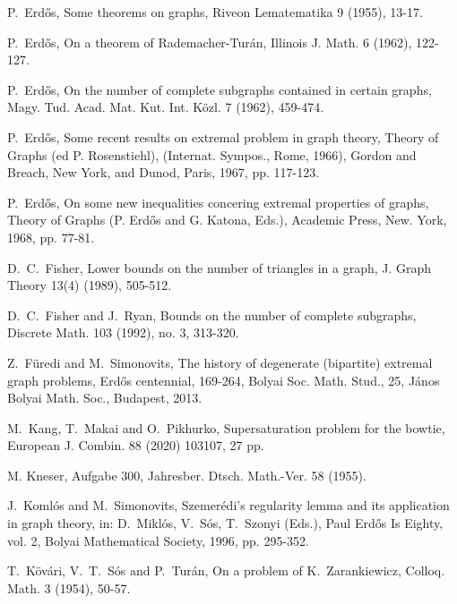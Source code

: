 \documentclass[10pt]{article}
\begin{document}
\begin{thebibliography}{1}




 P.~Erd\H{o}s, Some theorems on graphs, Riveon Lematematika 9 (1955), 13-17.

 P.~Erd\H{o}s, On a theorem of Rademacher-Tur\'an, Illinois J. Math. 6 (1962), 122-127.

 P.~Erd\H{o}s, On the number of complete subgraphs contained in certain graphs, Magy. Tud. Acad. Mat. Kut. Int. K\"ozl. 7 (1962), 459-474.

 P.~Erd\H{o}s, Some recent results on extremal problem in graph theory, Theory of Graphs (ed P. Rosenstiehl), (Internat. Sympos., Rome, 1966), Gordon and Breach, New York, and Dunod, Paris, 1967, pp. 117-123.

 P.~Erd\H{o}s, On some new inequalities concering extremal properties of graphs, Theory of Graphs (P. Erd\H{o}s and G. Katona, Eds.), Academic Press, New. York, 1968, pp. 77-81.

 D.~C.~Fisher, Lower bounds on the number of triangles in a graph, J. Graph Theory 13(4) (1989), 505-512.

 D.~C.~Fisher and J.~Ryan, Bounds on the number of complete subgraphs, Discrete Math. 103 (1992), no. 3, 313-320.

 Z.~F\"{u}redi and M.~Simonovits, The history of degenerate (bipartite) extremal graph problems, Erd\H{o}s centennial, 169-264, Bolyai Soc. Math. Stud., 25,  J\'{a}nos Bolyai Math. Soc., Budapest, 2013.



 M.~Kang, T.~Makai and O.~Pikhurko, Supersaturation problem for the bowtie, European J. Combin. 88 (2020) 103107, 27 pp.



 M. Kneser, Aufgabe 300, Jahresber. Dtsch. Math.-Ver. 58 (1955).

 J.~Koml\'{o}s and M.~Simonovits, Szemer\'{e}di's regularity lemma and its application in graph theory, in: D.~Mikl\'{o}s, V.~S\'{o}s, T.~Szonyi (Eds.), Paul Erd\H{o}s Is Eighty, vol. 2, Bolyai Mathematical Society, 1996, pp. 295-352.

 T.~K\"{o}v\'{a}ri, V.~T.~S\'{o}s and P.~Tur\'{a}n, On a problem of K.~Zarankiewicz, Colloq. Math. 3 (1954), 50-57.


\end{thebibliography}
\end{document}
